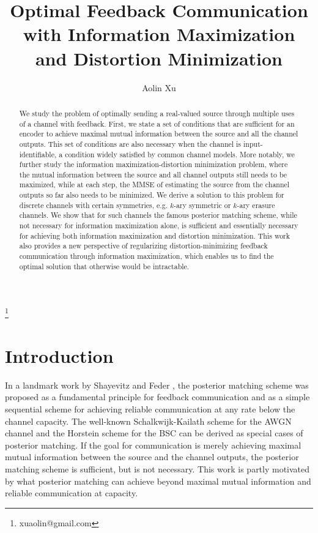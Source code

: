 \documentclass{article}
\newcommand\blfootnote[1]{%
	\begingroup
	\renewcommand\thefootnote{}\footnote{#1}%
	\addtocounter{footnote}{-1}%
	\endgroup
}
\begin{document}
\title{
Optimal Feedback Communication with Information Maximization and  Distortion Minimization
}
\date{}

\author{Aolin Xu}
\maketitle
\blfootnote{xuaolin@gmail.com}

\begin{abstract}
We study the problem of optimally sending a real-valued source through multiple uses of a channel with feedback. First, we state a set of conditions that are sufficient for an encoder to achieve maximal mutual information between the source and all the channel outputs. This set of conditions are also necessary when the channel is input-identifiable, a condition widely satisfied by common channel models.
More notably, we further study the information maximization-distortion minimization problem, where the mutual information between the source and all channel outputs still needs to be maximized, while at each step, the MMSE of estimating the source from the channel outputs so far also needs to be minimized. We derive a solution to this problem for discrete channels with certain symmetries, e.g. $k$-ary symmetric or $k$-ary erasure channels. We show that for such channels the famous posterior matching scheme, while not necessary for information maximization alone, is sufficient and essentially necessary for achieving both information maximization and distortion minimization.
This work also provides a new perspective of regularizing distortion-minimizing feedback communication through information maximization, which enables us to find the optimal solution that otherwise would be intractable.
\end{abstract}



\section{Introduction}
In a landmark work by Shayevitz and Feder \cite{pm2011}, the posterior matching scheme was proposed as 
a fundamental principle for feedback communication and as 
a simple sequential scheme 
for 
achieving reliable communication at any rate below the channel capacity.
The well-known Schalkwijk-Kailath scheme for the
AWGN channel \cite{SchalkwijkKailath,Schalkwijk66} and the Horstein
scheme for the BSC \cite{Horstein63}  can be derived as special cases of posterior matching.
If the goal for communication is merely achieving maximal mutual information between the source and the channel outputs, the posterior matching scheme is sufficient, but is not necessary. 
This work is partly motivated by what posterior matching can achieve beyond maximal mutual information and reliable communication at capacity.
\end{document}
